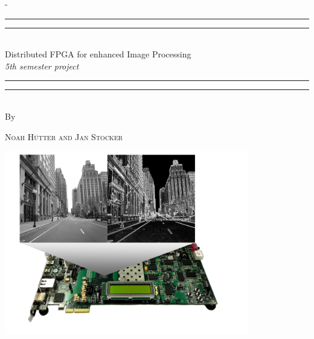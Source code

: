 \begin{titlingpage}
\begin{SingleSpace}
\calccentering{\unitlength} 
\begin{adjustwidth*}{\unitlength}{-\unitlength}
\vspace*{0mm}
\begin{center}
\rule[0.5ex]{\linewidth}{2pt}\vspace*{-\baselineskip}\vspace*{3.2pt}
\rule[0.5ex]{\linewidth}{1pt}\\[\baselineskip]

{\HUGE Distributed FPGA for enhanced Image Processing }\\[4mm]
{\Large \textit{5th semester project}}\\

\rule[0.5ex]{\linewidth}{1pt}\vspace*{-\baselineskip}\vspace{3.2pt}
\rule[0.5ex]{\linewidth}{2pt}\\
\vspace{2mm}
{\large By}\\
\vspace{2mm}

{\large\textsc{Noah H\"utter and Jan Stocker}}\\

\vspace{11mm}

\includegraphics[width=0.8\textwidth]{images/titlepage/p5_titlepage.png}\\

\vspace{2mm}


\end{center}
\end{adjustwidth*}
\end{SingleSpace}
\end{titlingpage}
